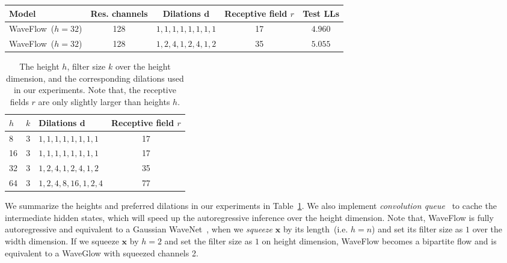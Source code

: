 \documentclass{article}
\newcommand{\vv}[1]{\boldsymbol{#1}}
\begin{document}
\begin{table*}[t!]
\centering
\caption{The test log-likelihoods~(LLs) of WaveFlow with different dilation cycles on the height dimension when $h = 32$. The models are stacked with $8$ flows and each flow has $8$ layers.}
\vspace{0.2em}
\begin{tabular}{l|c|c|c|c}
\hline 
Model & Res. channels  &  Dilations $\vv d$ & Receptive field $r$ & Test LLs
\\ \hline
WaveFlow~($h = 32$) & 128 & $ 1, 1, 1, 1, 1, 1, 1, 1$ & 17 & $4.960$ \\ 
WaveFlow~($h = 32$) & 128 & $ 1, 2, 4, 1, 2, 4, 1, 2$ & 35 & $5.055$ \\ 
\hline
\end{tabular}
\label{tab:small_receptive_field_poor_ll}
\end{table*}
\begin{table}[t!]
\centering
\vspace{-0.4cm}
\caption{The height $h$, filter size $k$ over the height dimension, and the corresponding dilations used in our experiments. Note that, the receptive fields $r$ are only slightly larger than heights $h$.}
\vspace{0.2em}
\begin{tabular}{l|c|l|c}
\hline 
 $h$ & $k$  & \quad Dilations $\vv d$   & Receptive field $r$
\\ \hline
8  & 3 & $ 1, 1, 1, 1, 1, 1, 1, 1$ & 17 \\ 
16 & 3 & $ 1, 1, 1, 1, 1, 1, 1, 1$ & 17 \\ 
32 & 3 & $ 1, 2, 4, 1, 2, 4, 1, 2$ & 35 \\ 
64 & 3 & $ 1, 2, 4, 8, 16, 1, 2, 4$ & 77 \\ 
\hline
\end{tabular}
\vspace{-0.15cm}
\label{tab:dilations}
\end{table}



We summarize the heights and preferred dilations in our experiments in Table~\ref{tab:dilations}.
We also implement \emph{convolution queue}~\citep{paine2016fast} to cache the intermediate hidden states, which will speed up the autoregressive inference over the height dimension.
Note that, WaveFlow is fully autoregressive and equivalent to a Gaussian WaveNet~\citep{ping2018clarinet}, when we \emph{squeeze} $\vv x$ by its length~(i.e. $h = n$) and set its filter size as $1$ over the width dimension. 
If we squeeze $\vv x$ by $h=2$ and set the filter size as $1$ on height dimension, WaveFlow becomes a bipartite flow and is equivalent to a WaveGlow with squeezed channels 2.
\end{document}
